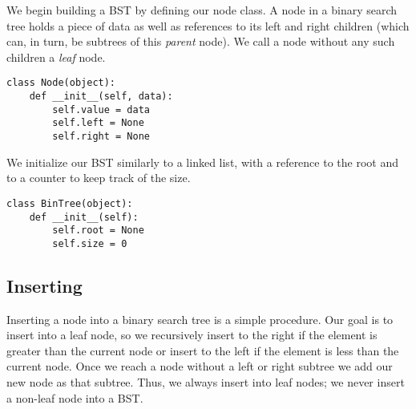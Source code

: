 We begin building a BST by defining our node class. A node in a binary search tree holds a piece of data as well as references to its left and right children (which can, in turn, be subtrees of this \emph{parent} node).
We call a node without any such children a \emph{leaf} node.

\begin{lstlisting}
class Node(object):
    def __init__(self, data):
        self.value = data
        self.left = None
        self.right = None
\end{lstlisting}
We initialize our BST similarly to a linked list, with a reference to the root and to a counter to keep track of the size.
\begin{lstlisting}
class BinTree(object):
    def __init__(self):
        self.root = None
        self.size = 0
\end{lstlisting}
\begin{comment}
BSTs are a recursive data structure because each of the left and right subtrees are themselves BSTs.

Many of the algorithms for working with binary search trees are also recursive.
A recursive function is a function that calls itself until it reaches a base case.
In the search function below, the two base cases either establish that we have the correct node, or that we don't have a node at all.
In both these cases, we simply return what we have.
If neither base case applies, we search either the left or the right subtree depending on if the data we are looking for is greater or less than the data in the node we are looking at.
While recursive functions are often useful and intuitive with trees, we don't have to use them if we don't want to.
In fact, for large trees, a recursive algorithm will consume a lot of resources.

\begin{lstlisting}
def search(data, node):
    if node is None or node.value == data:
        return node
    elif data < node.value:
        search(data, node.left)
    else:
        search(data, node.right)
\end{lstlisting}
\end{comment}
\subsection*{Inserting}
Inserting a node into a binary search tree is a simple procedure.
Our goal is to insert into a leaf node, so we recursively insert to the right if the element is greater than the current node or insert to the left if the element is less than the current node.
Once we reach a node without a left or right subtree we add our new node as that subtree.
Thus, we always insert into leaf nodes; we never insert a non-leaf node into a BST.


